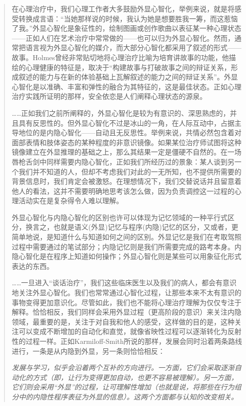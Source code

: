 \blockquote{
在心理治疗中，我们心理工作者大多鼓励外显心智化，举例来说，就是将感受转换成言语：“当她那样说的时候，我认为她是想要胜我一筹，而这惹恼了我。”外显心智化是象征性的，绘制图画或创作歌曲以表征某一种心理状态——正如人们在艺术治疗中常常做的——也可以归为外显心智化。然而，通常把语言视为外显心智化的媒介，而大部分心智化都采用了叙述的形式——故事。Holmes曾经非常贴切地将心理治疗比喻为培育讲故事的功能，他描绘的心理健康的特征是，取决于“构建故事与打破故事之间的辩证关系，形成叙述的能力与在新的体验基础上瓦解叙述的能力之间的辩证关系”。外显心智化是以准确、丰富和弹性的融合为其特征的，这是最佳状态。正如心理治疗实践所证明的那样，安全依恋是人们阐释心理状态的源泉。

……正如我们之前所阐释的，外显心智化是较为有意识的、深思熟虑的，并且具有反思性的。但外显心智化不过是冰山的一角，在人际互动中，占据主导地位的是内隐心智化——自动且无反思性。举例来说，共情必然包含着对面部表情和肢体姿态的某种程度的非意识镜像。如果某位治疗师试图将这种镜像建立在外显推理的基础之上，那么其结果一定是僵硬不自然的。在一场唇枪舌剑中同样需要内隐心智化，正如我们所经历过的景象：某人谈到另一个我们并不知道的人，但却不考虑我们对此的一无所知，也不提供所需要的背景信息时，我们肯定会被激怒。在理想情况下，我们交替说话并且留意着他人的看法，这并不需要明确地思考该怎么做，因为负责调控这一过程的心理活动实在是复杂得令人难以理解。

外显心智化与内隐心智化的区别也许可以体现为记忆领域的一种平行式区分，换言之，也就是语义(外显)记忆与程序(内隐)记忆的区分，又或者，更简单地说，是知道什么与知道如何之间的区别。外显记忆是我们在考取驾照过程中需要通过的笔试部分；内隐记忆则是我们所需要完成的路考本身。内隐心智化是在程序上知道如何操作；外显心智化则是某些可以用象征化形式表达的东西。

……一旦进入“谈话治疗”，我们这些临床医生以及我们的病人，都会有意识地关注外显心智化。我们也常常通过心智化过程，让那些本来不太有意识的事物变得更加意识化。尽管如此，我们也不能将心理治疗理解为仅仅专注于解释。恰恰相反，我们同样会采用外显过程（更高阶段的意识）来关注内隐领域，最重要的是，关注于对自我和他人的感受，这样做的目的是，这种关注可以变成不断增加的自动化和直觉，就像省映性过程可以逐渐转化为反射性的过程一样。正如Karmiloff-Smith所说的那样，发展会同时沿着两条路线进行，一条是从内隐到外显，另一条则恰恰相反：

\itshape 发展与学习，似乎会沿着两个互补的方向进行。一方面，它们会采取逐渐自动化的方式（即，让行为变得更加自动，也更不容易被理解）。另一方面，它们则会采用“外显”的过程，让可理解性增加（也就是说，将那些在行为组分中的内隐性程序表征为外显的信息）。这两个方面都与认知的改变相关。
}

